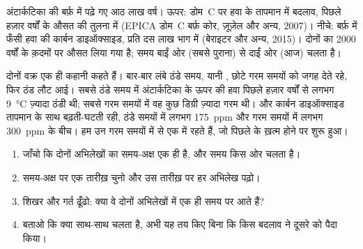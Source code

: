 \begin{omfigure}

{\small अंटार्कटिका की बर्फ़ में पढ़े गए आठ लाख वर्ष। ऊपर: डोम~C पर हवा के तापमान में
बदलाव, पिछले हज़ार वर्षों के औसत की तुलना में (EPICA डोम~C बर्फ़ कोर, ज़ूज़ेल और अन्य,
2007)। नीचे: बर्फ़ में फँसी हवा की कार्बन डाइऑक्साइड, प्रति दस लाख भाग में (बेराइटर और
अन्य, 2015)। दोनों का \num{2000} वर्षों के क़दमों पर औसत लिया गया है; समय बाईं ओर
(सबसे पुराना) से दाईं ओर (आज) चलता
है।}
\label{fig:g9:climate-past-and-present:icecore}
\end{omfigure}

दोनों वक्र एक ही कहानी कहते हैं। बार-बार लंबे ठंडे समय, यानी , छोटे गरम समयों को
जगह देते रहे, फिर ठंड लौट आई। सबसे ठंडे समय में अंटार्कटिका के ऊपर की हवा पिछले हज़ार
वर्षों से लगभग \qty{9}{\degreeCelsius} ज़्यादा ठंडी थी; सबसे गरम समयों में वह कुछ डिग्री
ज़्यादा गरम थी। और कार्बन डाइऑक्साइड तापमान के साथ बढ़ती-घटती रही, ठंडे समयों में लगभग
\qty{175}{ppm} और गरम समयों में लगभग \qty{300}{ppm} के बीच। हम उन गरम समयों में से
एक में रहते हैं, जो पिछले  के ख़त्म होने पर शुरू
हुआ।

\begin{method}[दो अभिलेखों को साथ-साथ पढ़ना]
\begin{enumerate}
  \item जाँचो कि दोनों अभिलेखों का समय-अक्ष एक ही है, और समय किस ओर
        चलता है।
  \item समय-अक्ष पर एक तारीख़ चुनो और उस तारीख़ पर हर अभिलेख पढ़ो।
  \item शिखर और गर्त ढूँढो: क्या वे दोनों अभिलेखों में एक ही समय पर आते
        हैं?
  \item बताओ कि क्या साथ-साथ चलता है, अभी यह तय किए बिना कि किस बदलाव ने
        दूसरे को पैदा किया।
\end{enumerate}
\end{method}

